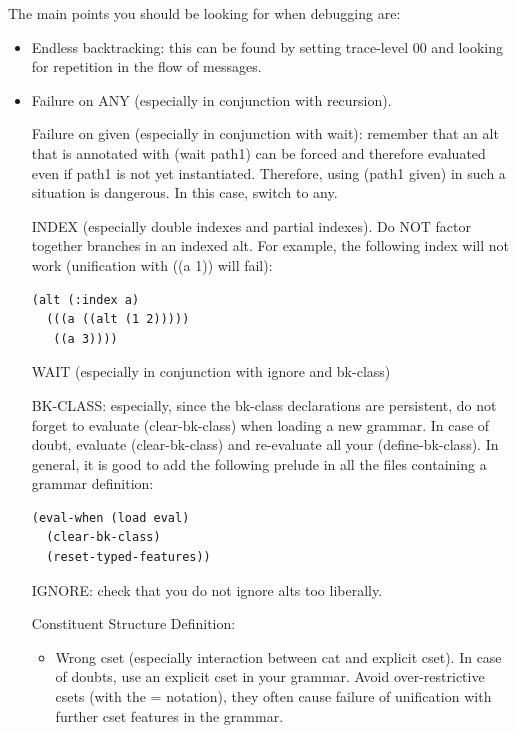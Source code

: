 \documentclass[10pt,a4paper]{report}
\begin{document}
The main points you should be looking for when debugging are:
\begin{itemize}
\item Endless backtracking: this can be found by setting trace-level 00 and
looking for repetition in the flow of messages.

\item Failure on ANY (especially in conjunction with recursion).

Failure on given (especially in conjunction with wait): remember that an
alt that is annotated with (wait path1) can be forced and therefore
evaluated even if path1 is not yet instantiated.  Therefore, using (path1
given) in such a situation is dangerous.  In this case, switch to any.

INDEX (especially double indexes and partial indexes).  Do NOT factor
together branches in an indexed alt.  For example, the following index will
not work (unification with ((a 1)) will fail):
\begin{lstlisting}
(alt (:index a)
  (((a ((alt (1 2)))))
   ((a 3))))
\end{lstlisting}

WAIT (especially in conjunction with ignore and bk-class)

BK-CLASS: especially, since the bk-class declarations are persistent, do
not forget to evaluate (clear-bk-class) when loading a new grammar.  In
case of doubt, evaluate (clear-bk-class) and re-evaluate all your
(define-bk-class).  In general, it is good to add the following prelude in
all the files containing a grammar definition:
\begin{lstlisting}
(eval-when (load eval)
  (clear-bk-class)
  (reset-typed-features))
\end{lstlisting}

IGNORE: check that you do not ignore alts too liberally.

Constituent Structure Definition:
\begin{itemize}
\item Wrong cset (especially interaction between cat and explicit cset).  In case
of doubts, use an explicit cset in your grammar.  Avoid over-restrictive
csets (with the = notation), they often cause failure of unification with
further cset features in the grammar.


\end{itemize}
\end{itemize}
\end{document}
